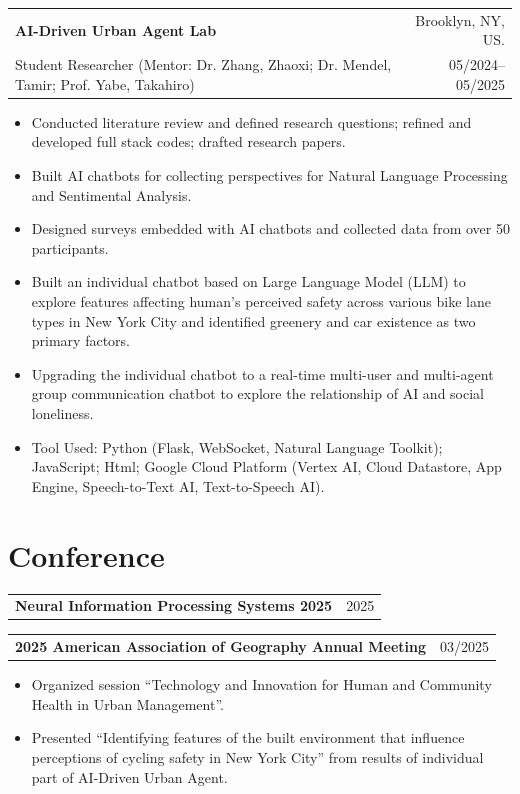 \documentclass[10pt,letterpaper]{article}
\makeatletter
\newcommand{\entry}[4]{%
  \begin{tabularx}{\textwidth}{@{}Xr@{}}
    \textbf{#1} & #3 \\
    #2 & #4 \\
  \end{tabularx}
}
\makeatother
\begin{document}
\entry{AI-Driven Urban Agent Lab}{Student Researcher (Mentor: Dr. Zhang, Zhaoxi; Dr. Mendel, Tamir; Prof. Yabe, Takahiro)}{Brooklyn, NY, US.}{05/2024--05/2025}
\begin{itemize}
  \item Conducted literature review and defined research questions; refined and developed full stack codes; drafted research papers.
  \item Built AI chatbots for collecting perspectives for Natural Language Processing and Sentimental Analysis.
  \item Designed surveys embedded with AI chatbots and collected data from over 50 participants.
  \item Built an individual chatbot based on Large Language Model (LLM) to explore features affecting human's perceived safety across various bike lane types in New York City and identified greenery and car existence as two primary factors.
  \item Upgrading the individual chatbot to a real-time multi-user and multi-agent group communication chatbot to explore the relationship of AI and social loneliness.
  \item Tool Used: Python (Flask, WebSocket, Natural Language Toolkit); JavaScript; Html; Google Cloud Platform (Vertex AI, Cloud Datastore, App Engine, Speech-to-Text AI, Text-to-Speech AI).
\end{itemize}

\section*{Conference}
\begin{tabularx}{\textwidth}{@{}Xr@{}}
\textbf{Neural Information Processing Systems 2025} & 2025
\end{tabularx}

\begin{tabularx}{\textwidth}{@{}Xr@{}}
\textbf{2025 American Association of Geography Annual Meeting} & 03/2025
\end{tabularx}
\begin{itemize}
  \item Organized session ``Technology and Innovation for Human and Community Health in Urban Management''.
  \item Presented ``Identifying features of the built environment that influence perceptions of cycling safety in New York City'' from results of individual part of AI-Driven Urban Agent.
\end{itemize}
\end{document}
